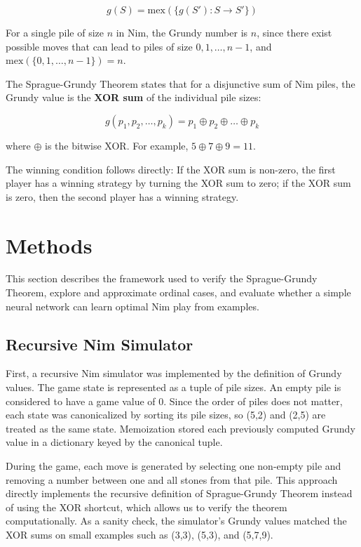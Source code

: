 \documentclass[11pt]{article}
\begin{document}
\[
g(S) = \text{mex}\left(\{g(S') : S \to S'\}\right)
\]

For a single pile of size $n$ in Nim, the Grundy number is $n$, since there exist possible moves that can lead to piles of size $0, 1, \dots, n-1$, and $\text{mex}(\{0,1,\dots,n-1\}) = n$.

The Sprague-Grundy Theorem states that for a disjunctive sum of Nim piles, the Grundy value is the \textbf{XOR sum} of the individual pile sizes:

\[
g(p_1, p_2, \dots, p_k) = p_1 \oplus p_2 \oplus \dots \oplus p_k
\]

where $\oplus$ is the bitwise XOR. For example, $5 \oplus 7\oplus9=11$.

The winning condition follows directly: If the XOR sum is non-zero, the first player has a winning strategy by turning the XOR sum to zero; if the XOR sum is zero, then the second player has a winning strategy. 





\section{Methods}
This section describes the framework used to verify the Sprague-Grundy Theorem, explore and approximate ordinal cases, and evaluate whether a simple neural network can learn optimal Nim play from examples. 
\subsection{Recursive Nim Simulator}
First, a recursive Nim simulator was implemented by the definition of Grundy values. The game state is represented as a tuple of pile sizes. An empty pile is considered to have a game value of 0. Since the order of piles does not matter, each state was canonicalized by sorting its pile sizes, so (5,2) and (2,5) are treated as the same state. Memoization stored each previously computed Grundy value in a dictionary keyed by the canonical tuple. 

During the game, each move is generated by selecting one non-empty pile and removing a number between one and all stones from that pile. This approach directly implements the recursive definition of Sprague-Grundy Theorem instead of using the XOR shortcut, which allows us to verify the theorem computationally. As a sanity check, the simulator's Grundy values matched the XOR sums on small examples such as (3,3), (5,3), and (5,7,9).
\end{document}
